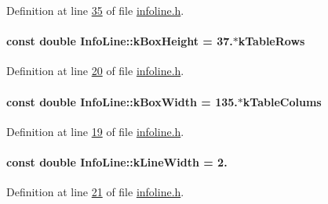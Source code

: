 Definition at line \hyperlink{infoline_8h_source_l00035}{35} of file \hyperlink{infoline_8h_source}{infoline.\+h}.

\hypertarget{class_info_line_a9e459549795bab79ae3b6c184dc78a00}{}
\paragraph[{k\+Box\+Height}]{\setlength{\rightskip}{0pt plus 5cm}const double Info\+Line\+::k\+Box\+Height = 37.$\ast${\bf k\+Table\+Rows}\hspace{0.3cm}{\ttfamily [static]}}\label{class_info_line_a9e459549795bab79ae3b6c184dc78a00}


Definition at line \hyperlink{infoline_8h_source_l00020}{20} of file \hyperlink{infoline_8h_source}{infoline.\+h}.

\hypertarget{class_info_line_a33821aa140dc03829357d4006e9c153c}{}
\paragraph[{k\+Box\+Width}]{\setlength{\rightskip}{0pt plus 5cm}const double Info\+Line\+::k\+Box\+Width = 135.$\ast${\bf k\+Table\+Colums}\hspace{0.3cm}{\ttfamily [static]}}\label{class_info_line_a33821aa140dc03829357d4006e9c153c}


Definition at line \hyperlink{infoline_8h_source_l00019}{19} of file \hyperlink{infoline_8h_source}{infoline.\+h}.

\hypertarget{class_info_line_ad072bc8ef178113c36c3d480c7d637ac}{}
\paragraph[{k\+Line\+Width}]{\setlength{\rightskip}{0pt plus 5cm}const double Info\+Line\+::k\+Line\+Width = 2.\hspace{0.3cm}{\ttfamily [static]}}\label{class_info_line_ad072bc8ef178113c36c3d480c7d637ac}


Definition at line \hyperlink{infoline_8h_source_l00021}{21} of file \hyperlink{infoline_8h_source}{infoline.\+h}.

